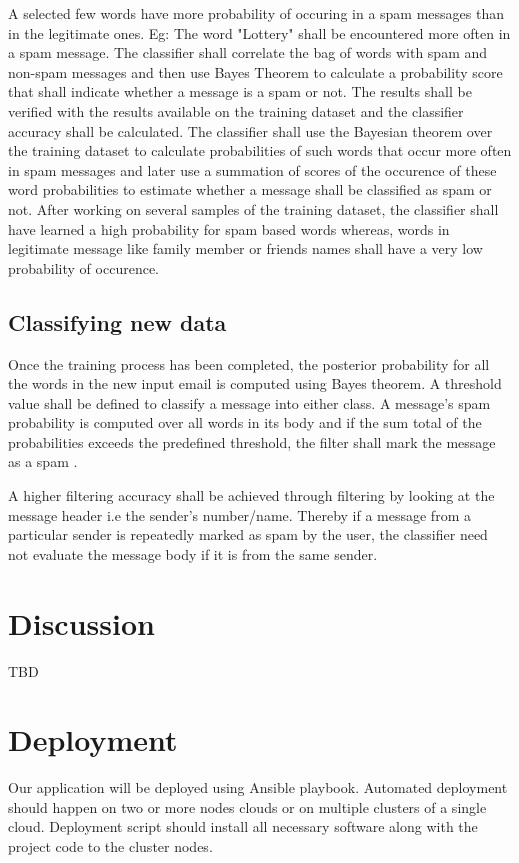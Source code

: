 \documentclass[9pt,twocolumn,twoside]{../../styles/osajnl}
\begin{document}
A selected few words have more probability of occuring in a spam
messages than in the legitimate ones. Eg: The word "Lottery" shall be
encountered more often in a spam message.  The classifier shall
correlate the bag of words with spam and non-spam messages and then
use Bayes Theorem to calculate a probability score that shall indicate
whether a message is a spam or not. The results shall be verified with
the results available on the training dataset and the classifier
accuracy shall be calculated.  The classifier shall use the Bayesian
theorem over the training dataset to calculate probabilities of such
words that occur more often in spam messages and later use a summation
of scores of the occurence of these word probabilities to estimate
whether a message shall be classified as spam or not. After working on
several samples of the training dataset, the classifier shall have
learned a high probability for spam based words whereas, words in
legitimate message like family member or friends names shall have a
very low probability of occurence.

\subsection{Classifying new data}

Once the training process has been completed, the posterior
probability for all the words in the new input email is computed using
Bayes theorem. A threshold value shall be defined to classify a
message into either class. A message's spam probability is computed
over all words in its body and if the sum total of the probabilities
exceeds the predefined threshold, the filter shall mark the message as
a spam \cite{www-wiki-naivebayes}.

A higher filtering accuracy shall be achieved through filtering by
looking at the message header i.e the sender's number/name. Thereby if
a message from a particular sender is repeatedly marked as spam by the
user, the classifier need not evaluate the message body if it is from
the same sender.


\section{Discussion}
TBD


\section{Deployment}
Our application will be deployed using Ansible \cite{www-ansible}
playbook. Automated deployment should happen on two or more nodes
clouds or on multiple clusters of a single cloud. Deployment script
should install all necessary software along with the project code to
the cluster nodes.
\end{document}
